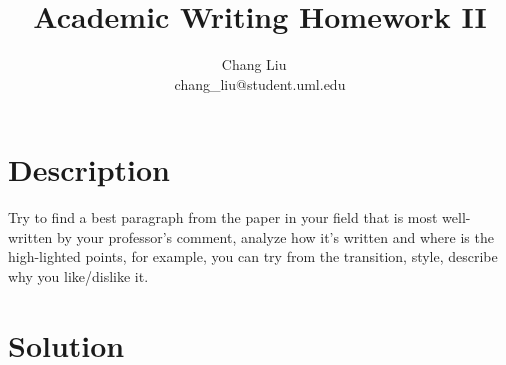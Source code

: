 \documentclass{article}
\title{Academic Writing Homework II}
\author{Chang Liu ~\\ chang\_liu@student.uml.edu}
\begin{document}
\maketitle

\section{Description}

Try to find a best paragraph from the paper in your field that is most well-written by your professor's comment, analyze how it's written and where is the high-lighted points, for example, you can try from the transition, style, describe why you like/dislike it.

\section{Solution} 
\end{document}
